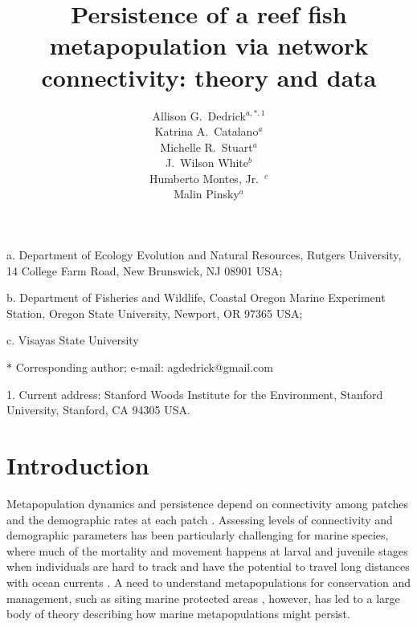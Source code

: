\documentclass[12pt, oneside]{article}   	%
\author{}
\author{Allison G.\ Dedrick$^{a, \ast, 1}$ \\
Katrina A.\ Catalano$^a$ \\
Michelle R.\ Stuart$^a$ \\
J.\ Wilson White$^b$ \\
Humberto Montes, Jr.\ $^c$ \\
Malin Pinsky$^a$}
\title{Persistence of a reef fish metapopulation via network connectivity: theory and data}
\date{}
\begin{document}
\renewcommand{\topfraction}{0.95}
\maketitle{}

\noindent{} a. Department of Ecology Evolution and Natural Resources, Rutgers University, 14 College Farm Road, New Brunswick, NJ 08901 USA;

\noindent{} b. Department of Fisheries and Wildlife, Coastal Oregon Marine Experiment Station, Oregon State University, Newport, OR 97365 USA;

\noindent{} c. Visayas State University

\noindent{} $\ast$ Corresponding author; e-mail: agdedrick@gmail.com

\noindent{} 1. Current address: Stanford Woods Institute for the Environment, Stanford University, Stanford, CA 94305 USA.


\bigskip




\section*{Introduction}
Metapopulation dynamics and persistence depend on connectivity among patches and the demographic rates at each patch \citep[e.g.][]{hastings_persistence_2006, hanski1998metapopulation}. Assessing levels of connectivity and demographic parameters has been particularly challenging for marine species, where much of the mortality and movement happens at larval and juvenile stages when individuals are hard to track and have the potential to travel long distances with ocean currents \citep[reviewed in][]{white2019connectivity}. A need to understand metapopulations for conservation and management, such as siting marine protected areas \citep[e.g.][]{botsford_dependence_2001,white_population_2010}, however, has led to a large body of theory describing how marine metapopulations might persist. 
\end{document}
